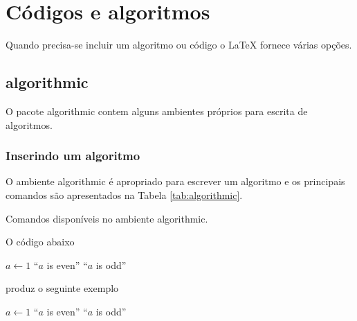 % 
% 
% 
% 
% 
\chapter{Códigos e algoritmos}
Quando precisa-se incluir um algoritmo ou código o LaTeX fornece várias opções.

\section{\textsf{algorithmic}}

O pacote \textsf{algorithmic} contem alguns ambientes próprios para escrita de algoritmos.

\subsection{Inserindo um algoritmo}

O ambiente \textsf{algorithmic} é apropriado para escrever um algoritmo e os principais comandos são apresentados na Tabela \ref{tab:algorithmic}.
\begin{table}[h!tb]
    \centering
    \caption{Comandos disponíveis no ambiente \textsf{algorithmic}.}
    \label{tab:algorithmic}
    
\end{table}

O código abaixo
\begin{latexcode}
    \begin{algorithmic}
        \STATE $a \leftarrow 1$
        \PRINT ``$a$ is even''
        \ELSE
        \PRINT ``$a$ is odd''
        \ENDIF
    \end{algorithmic}
\end{latexcode}
produz o seguinte exemplo
\begin{algorithmic}
    \STATE $a \leftarrow 1$
    \PRINT ``$a$ is even''
    \ELSE
    \PRINT ``$a$ is odd''
    \ENDIF
\end{algorithmic}

